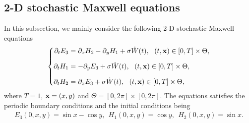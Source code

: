 \documentclass[preprint,12pt]{article}
\numberwithin{figure}{section}
\numberwithin{table}{section}
\numberwithin{equation}{section}
\begin{document}
\subsection{2-D stochastic Maxwell equations}
In this subsection, we mainly consider the following 2-D stochastic Maxwell equations
\begin{equation}\label{4.2}
\left\{
\begin{split}
\partial_{t}E_{3}&=\partial_{x}H_{2}-\partial_{y}H_{1}+\sigma\dot{W}(t),~~(t,{\bf x})\in[0,T]\times\Theta,\\[2mm]
\partial_{t}H_{1}&=-\partial_{y}E_{3}+\sigma\dot{W}(t),~~(t,{\bf x})\in[0,T]\times\Theta,\\[2mm]
\partial_{t}H_{2}&=\partial_{x}E_{3}+\sigma\dot{W}(t),~~(t,{\bf x})\in[0,T]\times\Theta,
\end{split}\right.
\end{equation}
where $T=1$, ${\bf x}=(x,y)$ and $\Theta =\left [0, 2\pi \right]\times \left[0, 2\pi\right]$. The equations satisfies the periodic boundary conditions and the initial conditions being
\begin{equation*}
\begin{split}
E_{3}(0,x,y)=\sin{x}-\cos{y},~~H_{1}(0,x,y)=\cos{y},~~H_{2}(0,x,y)=\sin{x}.
\end{split}
\end{equation*}
\end{document}

